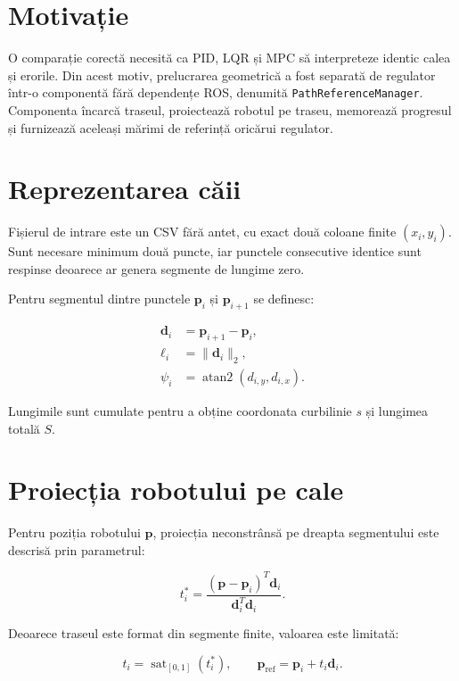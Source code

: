 \documentclass[12pt,a4paper,oneside]{report}
\newcommand{\sat}{\operatorname{sat}}
\begin{document}
\section{Motivație}

O comparație corectă necesită ca PID, LQR și MPC să interpreteze identic calea și
erorile. Din acest motiv, prelucrarea geometrică a fost separată de regulator
într-o componentă fără dependențe ROS, denumită
\texttt{PathReferenceManager}. Componenta încarcă traseul, proiectează robotul
pe traseu, memorează progresul și furnizează aceleași mărimi de referință
oricărui regulator.

\section{Reprezentarea căii}

Fișierul de intrare este un CSV fără antet, cu exact două coloane finite
$(x_i,y_i)$. Sunt necesare minimum două puncte, iar punctele consecutive identice
sunt respinse deoarece ar genera segmente de lungime zero.

Pentru segmentul dintre punctele $\mathbf{p}_i$ și $\mathbf{p}_{i+1}$ se definesc:

\begin{align}
  \mathbf{d}_i &= \mathbf{p}_{i+1}-\mathbf{p}_i, \\
  \ell_i &= \lVert\mathbf{d}_i\rVert_2, \\
  \psi_i &= \operatorname{atan2}(d_{i,y},d_{i,x}).
\end{align}

Lungimile sunt cumulate pentru a obține coordonata curbilinie $s$ și lungimea
totală $S$.

\section{Proiecția robotului pe cale}

Pentru poziția robotului $\mathbf{p}$, proiecția neconstrânsă pe dreapta
segmentului este descrisă prin parametrul:

\begin{equation}
  t_i^*=\frac{(\mathbf{p}-\mathbf{p}_i)^T\mathbf{d}_i}
  {\mathbf{d}_i^T\mathbf{d}_i}.
\end{equation}

Deoarece traseul este format din segmente finite, valoarea este limitată:

\begin{equation}
  t_i=\sat_{[0,1]}(t_i^*), \qquad
  \mathbf{p}_{\mathrm{ref}}=\mathbf{p}_i+t_i\mathbf{d}_i.
\end{equation}
\end{document}

